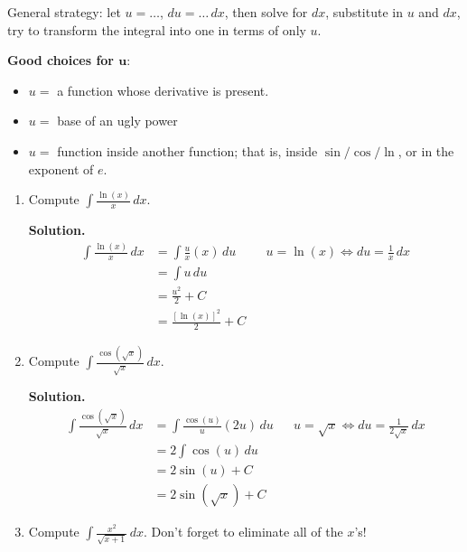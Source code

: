 General strategy: let $ u=\ldots $, $ du=\ldots\,dx $, then solve for
$ dx $, substitute in $ u $ and $ dx $, try to transform the integral into one
in terms of only $ u $.

\textbf{Good choices for $ \bm{u} $}:
\begin{itemize}
    \item $ u= $ a function whose derivative is present.
    \item $ u= $ base of an ugly power
    \item $ u= $ function inside another function; that is, inside $ \sin/\cos/\ln $,
          or in the exponent of $ e $.
\end{itemize}

\begin{Example}{}{}
    \begin{enumerate}[label=(\roman*)]
        \item Compute $ \displaystyle  \int \frac{\ln(x)}{x} \, d{x} $.

              \textbf{Solution.}
              \begin{align*}
                  \int \frac{\ln(x)}{x} \, d{x}
                   & =\int \frac{u}{x} (x)\, d{u} &  & u=\ln(x)\iff du=\frac{1}{x}\, dx \\
                   & =\int u\, d{u}                                                     \\
                   & =\frac{u^2}{2} +C                                                  \\
                   & =\frac{[\ln(x)]^2}{2} +C
              \end{align*}
        \item Compute $ \displaystyle \int \frac{\cos(\sqrt{x})}{\sqrt{x}} \, d{x} $.

              \textbf{Solution.}
              \begin{align*}
                  \int \frac{\cos(\sqrt{x})}{\sqrt{x}} \, d{x}
                   & = \int \frac{\cos(u)}{u}(2u) \, d{u} &  & u=\sqrt{x}\iff du=\frac{1}{2\sqrt{x}}\, dx \\
                   & =2 \int \cos(u)\, d{u}                                                               \\
                   & =2\sin(u)+C                                                                          \\
                   & =2\sin(\sqrt{x})+C
              \end{align*}
        \item Compute
              $ \displaystyle \int \frac{x^2}{\sqrt{x+1}} \, d{x} $.
              Don't forget to eliminate all of the $ x $'s!


\end{enumerate}
\end{Example}
